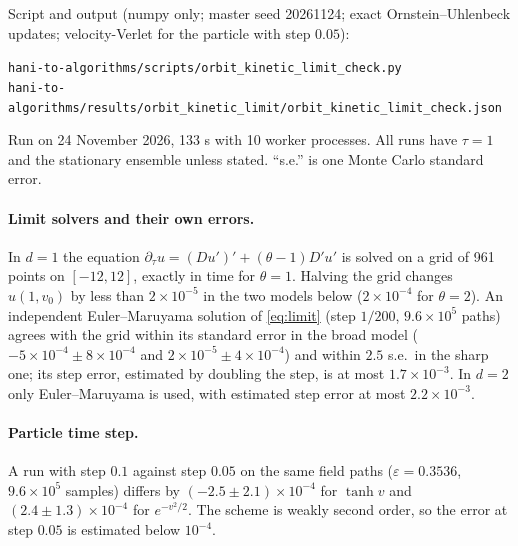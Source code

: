 \documentclass[11pt]{article}
\newcommand{\eps}{\varepsilon}
\theoremstyle{remark}
\begin{document}
Script and output (numpy only; master seed 20261124; exact
Ornstein--Uhlenbeck updates; velocity-Verlet for the particle with step
$0.05$):
\begin{center}
\texttt{hani-to-algorithms/scripts/orbit\_kinetic\_limit\_check.py}\\
\texttt{hani-to-algorithms/results/orbit\_kinetic\_limit/orbit\_kinetic\_limit\_check.json}
\end{center}
Run on 24 November 2026, 133 s with 10 worker processes. All runs have
$\tau=1$ and the stationary ensemble unless stated. ``s.e.'' is one Monte
Carlo standard error.

\paragraph{Limit solvers and their own errors.} In $d=1$ the equation
$\partial_\tau u=(Du')'+(\theta-1)D'u'$ is solved on a grid of 961 points
on $[-12,12]$, exactly in time for $\theta=1$. Halving the grid changes
$u(1,v_0)$ by less than $2\times10^{-5}$ in the two models below
($2\times10^{-4}$ for $\theta=2$). An independent Euler--Maruyama solution
of \eqref{eq:limit} (step $1/200$, $9.6\times10^5$ paths) agrees with the
grid within its standard error in the broad model
($-5\times10^{-4}\pm8\times10^{-4}$ and $2\times10^{-5}\pm4\times10^{-4}$)
and within $2.5$ s.e.\ in the sharp one; its step error, estimated by
doubling the step, is at most $1.7\times10^{-3}$. In $d=2$ only
Euler--Maruyama is used, with estimated step error at most
$2.2\times10^{-3}$.

\paragraph{Particle time step.} A run with step $0.1$ against step $0.05$
on the same field paths ($\eps=0.3536$, $9.6\times10^5$ samples) differs by
$(-2.5\pm2.1)\times10^{-4}$ for $\tanh v$ and $(2.4\pm1.3)\times10^{-4}$ for
$e^{-v^2/2}$. The scheme is weakly second order, so the error at step
$0.05$ is estimated below $10^{-4}$.
\end{document}
